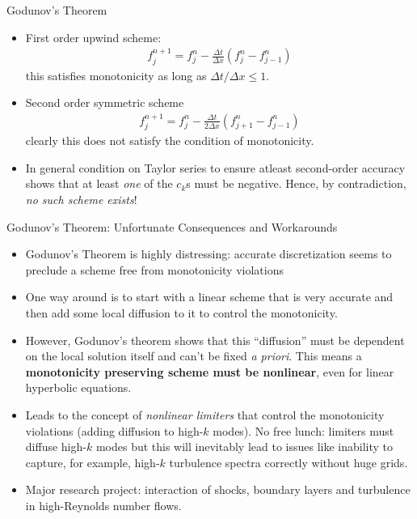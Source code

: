 \documentclass[aspectratio=169]{beamer}
\newcommand{\mypause}{}
\begin{document}
\begin{frame}{Godunov's Theorem}
  \small%
  \begin{itemize}
  \item First order upwind scheme:
    \begin{align*}
      f_j^{n+1} = f_j^n -\frac{\Delta t}{\Delta x}(f_j^n - f_{j-1}^n)
    \end{align*}
    this satisfies monotonicity as long as
    ${\Delta t}/{\Delta x} \le 1$.%
    \mypause%
  \item Second order symmetric scheme
    \begin{align*}
      f_j^{n+1} = f_j^n -\frac{\Delta t}{2 \Delta x}(f_{j+1}^n - f_{j-1}^n)
    \end{align*}
    clearly this does not satisfy the condition of monotonicity.
    \mypause%
  \item In general condition on Taylor series to ensure atleast
    second-order accuracy shows that at least \emph{one} of the $c_k$s
    must be negative. Hence, by contradiction, \emph{no such scheme
      exists}!
  \end{itemize}
\end{frame}

\begin{frame}{Godunov's Theorem: Unfortunate Consequences and Workarounds}
  \small%
  \begin{itemize}
  \item Godunov's Theorem is highly distressing: accurate
    discretization seems to preclude a scheme free from monotonicity
    violations
    \mypause%
  \item One way around is to start with a linear scheme that is very
    accurate and then add some local diffusion to it to control the
    monotonicity.%
    \mypause%
  \item However, Godunov's theorem shows that this ``diffusion'' must
    be dependent on the local solution itself and can't be fixed
    \emph{a priori}. This means a {\bf monotonicity preserving scheme
      must be nonlinear}, even for linear hyperbolic equations.%
    \mypause%
  \item Leads to the concept of \emph{nonlinear limiters} that control
    the monotonicity violations (adding diffusion to high-$k$ modes).
    No free lunch: limiters must diffuse high-$k$ modes but this will
    inevitably lead to issues like inability to capture, for example,
    high-$k$ turbulence spectra correctly without huge grids.
  \item Major research project: interaction of shocks, boundary layers
    and turbulence in high-Reynolds number flows.
  \end{itemize}
\end{frame}
\end{document}
